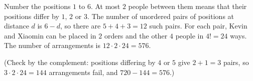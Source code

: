 Number the positions $1$ to $6$. At most $2$ people between them means that their positions differ by $1$, $2$ or $3$. The number of unordered pairs of positions at distance $d$ is $6-d$, so there are $5+4+3=12$ such pairs. For each pair, Kevin and Xiaomin can be placed in $2$ orders and the other $4$ people in $4!=24$ ways. The number of arrangements is $12\cdot2\cdot24=\boxed{576}$.

(Check by the complement: positions differing by $4$ or $5$ give $2+1=3$ pairs, so $3\cdot2\cdot24=144$ arrangements fail, and $720-144=576$.)
